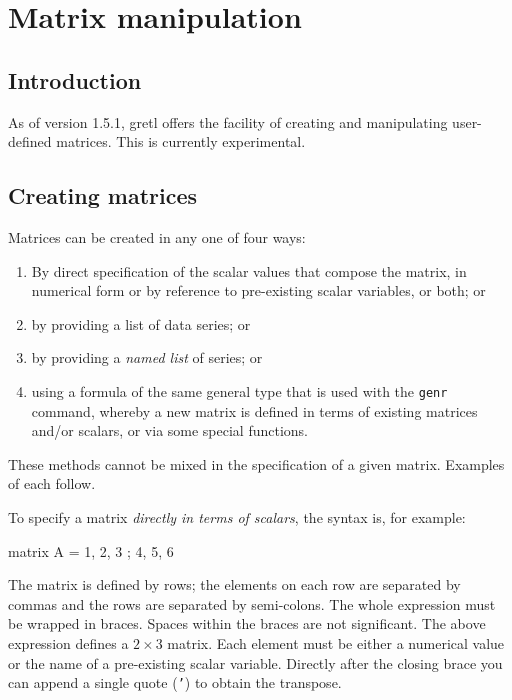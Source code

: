 \chapter{Matrix manipulation}
\label{chap-matrices}

\section{Introduction}
\label{matrix-intro}

As of version 1.5.1, gretl offers the facility of creating and
manipulating user-defined matrices.  This is currently experimental.

\section{Creating matrices}
\label{matrix-create}

Matrices can be created in any one of four ways:

\begin{enumerate}
\item By direct specification of the scalar values that compose the
  matrix, in numerical form or by reference to pre-existing
  scalar variables, or both; or
\item by providing a list of data series; or
\item by providing a \textit{named list} of series; or
\item using a formula of the same general type that is used
  with the \texttt{genr} command, whereby a new matrix is defined
  in terms of existing matrices and/or scalars, or via some
  special functions.
\end{enumerate}

These methods cannot be mixed in the specification of a given matrix.
Examples of each follow.

To specify a matrix \textit{directly in terms of scalars}, the syntax
is, for example:

\begin{code}
matrix A = { 1, 2, 3 ; 4, 5, 6 }
\end{code}

The matrix is defined by rows; the elements on each row are separated
by commas and the rows are separated by semi-colons.  The whole
expression must be wrapped in braces.  Spaces within the braces are
not significant.  The above expression defines a $2\times3$ matrix.
Each element must be either a numerical value or the name of a
pre-existing scalar variable.  Directly after the closing brace you
can append a single quote (\texttt{'}) to obtain the transpose.

